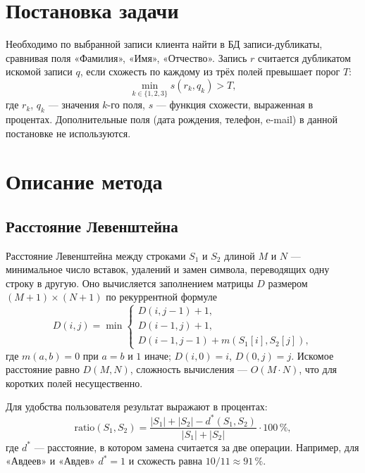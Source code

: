 \documentclass{misisarticle}
\begin{document}
\section{Постановка задачи}

Необходимо по выбранной записи клиента найти в БД записи-дубликаты, сравнивая поля «Фамилия», «Имя», «Отчество». Запись $r$ считается дубликатом искомой записи $q$, если схожесть по каждому из трёх полей превышает порог $T$:
\begin{equation}
\min_{k \in \{1,2,3\}} s(r_k, q_k) > T,
\label{eq:criterion}
\end{equation}
где $r_k$, $q_k$ --- значения $k$-го поля, $s$ --- функция схожести, выраженная в процентах. Дополнительные поля (дата рождения, телефон, e-mail) в данной постановке не используются.

\section{Описание метода}

\subsection{Расстояние Левенштейна}

Расстояние Левенштейна между строками $S_1$ и $S_2$ длиной $M$ и $N$ --- минимальное число вставок, удалений и замен символа, переводящих одну строку в другую. Оно вычисляется заполнением матрицы $D$ размером $(M{+}1){\times}(N{+}1)$ по рекуррентной формуле
\begin{equation}
D(i,j)=\min\begin{cases}
D(i,j-1)+1,\\
D(i-1,j)+1,\\
D(i-1,j-1)+m(S_1[i],S_2[j]),
\end{cases}
\label{eq:lev}
\end{equation}
где $m(a,b)=0$ при $a=b$ и $1$ иначе; $D(i,0)=i$, $D(0,j)=j$. Искомое расстояние равно $D(M,N)$, сложность вычисления --- $O(M \cdot N)$, что для коротких полей несущественно.

Для удобства пользователя результат выражают в процентах:
\begin{equation}
\mathrm{ratio}(S_1,S_2)=\frac{|S_1|+|S_2|-d^{*}(S_1,S_2)}{|S_1|+|S_2|}\cdot 100\,\%,
\label{eq:ratio}
\end{equation}
где $d^{*}$ --- расстояние, в котором замена считается за две операции. Например, для «Авдеев» и «Авдев» $d^{*}=1$ и схожесть равна $10/11\approx 91\,\%$.
\end{document}
